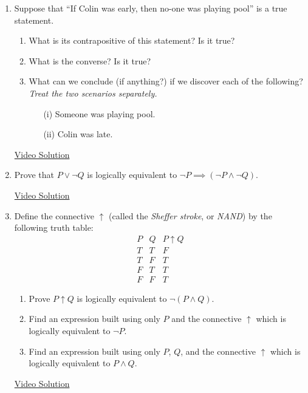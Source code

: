 \begin{enumerate}
  \item Suppose that ``If Colin was early, then no-one was playing pool'' is a true statement.
		\begin{enumerate}
	  	\item What is its contrapositive of this statement? Is it true?
	  	\item What is the converse? Is it true?
	  	\item What can we conclude (if anything?) if we discover each of the following? \emph{Treat the two scenarios separately.}
			\begin{enumerate}
	  	  \item[(i)] Someone was playing pool.
	      \item[(ii)] Colin was late.
			\end{enumerate}
		\end{enumerate}
		
		\href{https://youtu.be/BI_M1-OoMac}{Video Solution}
  
  \item Prove that $P \lor \neg Q$ is logically equivalent to $\neg P \implies (\neg P \land \neg Q)$.
  
  \href{https://youtu.be/NrbdGXAP6Ug}{Video Solution}
  
  \item Define the connective $\uparrow$ (called the \emph{Sheffer stroke}, or \emph{NAND}) by the following truth table:
  \[
  \begin{array}{cc|c}
P & Q & P \uparrow Q\\\hline
T & T & F\\
T & F & T\\
F & T & T\\
F & F & T
\end{array}
  \]
  \begin{enumerate}
      \item Prove $P \uparrow Q$ is logically equivalent to $\neg (P \land Q)$. 
      \item Find an expression built using only $P$ and the connective $\uparrow$ which is logically equivalent to $\neg P$.
      \item Find an expression built using only $P$, $Q$, and the connective $\uparrow$ which is logically equivalent to $P \land Q$.
  \end{enumerate}
  
  \href{https://youtu.be/bxYgvuXtcTM}{Video Solution}
  
\end{enumerate}